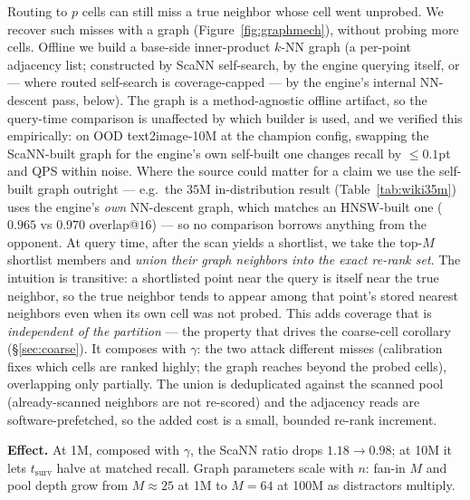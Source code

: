 \documentclass{article}
\newcommand{\effect}[1]{\par\smallskip\noindent\textbf{Effect.} #1}
\begin{document}
\label{sec:graph}
Routing to $p$ cells can still miss a true neighbor whose cell went unprobed. We
recover such misses with a graph (Figure~\ref{fig:graphmech}), without probing more cells. Offline we build a
base-side inner-product $k$-NN graph (a per-point adjacency list; constructed by
ScaNN self-search, by the engine querying itself, or --- where routed self-search is
coverage-capped --- by the engine's internal NN-descent pass, below). The graph is a method-agnostic offline artifact, so the query-time comparison is
unaffected by which builder is used, and we verified this empirically: on OOD
text2image-10M at the champion config, swapping the ScaNN-built graph for the engine's
own self-built one changes recall by ${\le}0.1$pt and QPS within noise. Where the source
could matter for a claim we use the self-built graph outright --- e.g.\ the $35$M
in-distribution result (Table~\ref{tab:wiki35m}) uses the engine's \emph{own} NN-descent
graph, which matches an HNSW-built one ($0.965$ vs $0.970$ overlap@$16$) ---
so no comparison borrows anything from the opponent.
At query time, after the scan yields a shortlist, we take the top-$M$
shortlist members and \emph{union their graph neighbors into the exact re-rank set}.
The intuition is transitive: a shortlisted point near the query is itself near the
true neighbor, so the true neighbor tends to appear among that point's stored nearest
neighbors even when its own cell was not probed. This adds coverage that is
\emph{independent of the partition} --- the property that drives the coarse-cell
corollary (\S\ref{sec:coarse}). It composes with $\gamma$: the two attack different
misses (calibration fixes which cells are ranked highly; the graph reaches beyond the
probed cells), overlapping only partially. The union is deduplicated against the
scanned pool (already-scanned neighbors are not re-scored) and the adjacency reads are
software-prefetched, so the added cost is a small, bounded re-rank increment.
\effect{At 1M, composed with $\gamma$, the ScaNN ratio drops $1.18\to0.98$; at 10M it lets $t_{\text{surv}}$ halve at matched recall.
Graph parameters scale with $n$: fan-in $M$ and pool depth grow from $M{\approx}25$
at 1M to $M{=}64$ at 100M as distractors multiply.}
\end{document}

